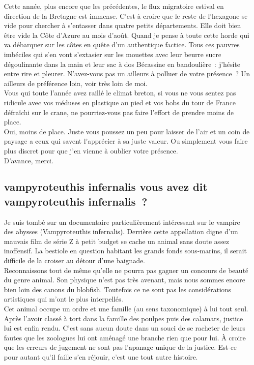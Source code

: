 Cette année, plus encore que les précédentes, le flux migratoire estival en direction de la Bretagne est immense. C’est à croire que le reste de l’hexagone se vide pour chercher à s’entasser dans quatre petits départements. Elle doit bien être vide la Côte d’Azure au mois d’août. Quand je pense à toute cette horde qui va débarquer sur les côtes en quête d’un authentique factice. Tous ces pauvres imbéciles qui s’en vont s’extasier sur les mouettes avec leur beurre sucre dégoulinante dans la main et leur sac à dos Bécassine en bandoulière : j’hésite entre rire et pleurer. N’avez-vous pas un ailleurs à polluer de votre présence ? Un ailleurs de préférence loin, voir très loin de moi. \\
Vous qui toute l’année avez raillé le climat breton, si vous ne vous sentez pas ridicule avec vos méduses en plastique au pied et vos bobs du tour de France défraîchi sur le crane, ne pourriez-vous pas faire l’effort de prendre moins de place. \\
Oui, moins de place. Juste vous poussez un peu pour laisser de l’air et un coin de paysage a ceux qui savent l’apprécier à sa juste valeur. Ou simplement vous faire plus discret pour que j’en vienne à oublier votre présence. \\

D’avance, merci.

\subsection*{vampyroteuthis infernalis vous avez dit vampyroteuthis infernalis ?}
Je suis tombé sur un documentaire particulièrement intéressant sur le vampire des abysses (Vampyroteuthis infernalis). Derrière cette appellation digne d’un mauvais film de série Z à petit budget se cache un animal sans doute assez inoffensif. La bestiole en question habitant les grands fonds sous-marins, il serait difficile de la croiser au détour d’une baignade. \\
Reconnaissons tout de même qu’elle ne pourra pas gagner un concours de beauté du genre animal. Son physique n’est pas très avenant, mais nous sommes encore bien loin des canons du blobfish. Toutefois ce ne sont pas les considérations artistiques qui m’ont le plus interpellés. \\
Cet animal occupe un ordre et une famille (au sens taxonomique) à lui tout seul.   Après l’avoir classé à tort dans la famille des poulpes puis des calamars, justice lui est enfin rendu. C’est sans aucun doute dans un souci de se racheter de leurs fautes que les zoologues lui ont aménagé une branche rien que pour lui. À croire que les erreurs de jugement ne sont pas l’apanage unique de la justice. Est-ce pour autant qu’il faille s’en réjouir, c’est une tout autre histoire.
